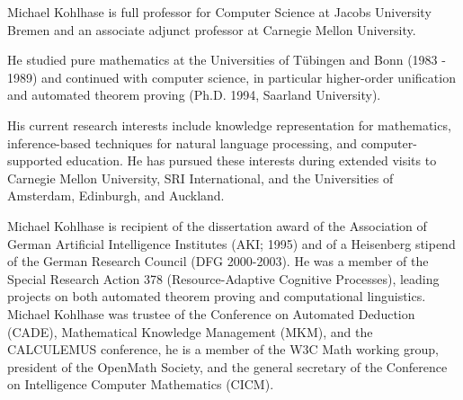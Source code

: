 \begin{participant}[type=leadPI,gender=male,PM=6]{Michael Kohlhase}
  is full professor for Computer Science at Jacobs University Bremen
  and an associate adjunct professor at Carnegie Mellon University.

  He studied pure mathematics at the Universities of T\"ubingen and Bonn (1983 - 1989) and
  continued with computer science, in particular higher-order unification and automated
  theorem proving (Ph.D. 1994, Saarland University).

  His current research interests include knowledge representation for mathematics,
  inference-based techniques for natural language processing, and computer-supported
  education. He has pursued these interests during extended visits to Carnegie Mellon
  University, SRI International, and the Universities of Amsterdam, Edinburgh, and
  Auckland.

  Michael Kohlhase is recipient of the dissertation award of the Association of German
  Artificial Intelligence Institutes (AKI; 1995) and of a Heisenberg stipend of the German
  Research Council (DFG 2000-2003). He was a member of the Special Research Action 378
  (Resource-Adaptive Cognitive Processes), leading projects on both automated theorem
  proving and computational linguistics. Michael Kohlhase was trustee of the Conference on
  Automated Deduction (CADE), Mathematical Knowledge Management (MKM), and the CALCULEMUS
  conference, he is a member of the W3C Math working group, president of the OpenMath
  Society, and the general secretary of the Conference on Intelligence Computer
  Mathematics (CICM).
\end{participant}



 


